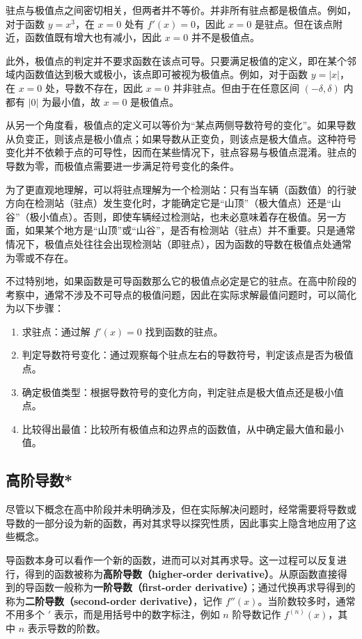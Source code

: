 驻点与极值点之间密切相关，但两者并不等价。并非所有驻点都是极值点。例如，对于函数 $y = x^3$，在 $x = 0$ 处有 $f'(x) = 0$，因此 $x = 0$ 是驻点。但在该点附近，函数值既有增大也有减小，因此 $x = 0$ 并不是极值点。

此外，极值点的判定并不要求函数在该点可导。只要满足极值的定义，即在某个邻域内函数值达到极大或极小，该点即可被视为极值点。例如，对于函数 $y = |x|$，在 $x = 0$ 处，导数不存在，因此 $x = 0$ 并非驻点。但由于在任意区间 $(-\delta, \delta)$ 内都有 $|0|$ 为最小值，故 $x = 0$ 是极值点。

从另一个角度看，极值点的定义可以等价为“某点两侧导数符号的变化”。如果导数从负变正，则该点是极小值点；如果导数从正变负，则该点是极大值点。这种符号变化并不依赖于点的可导性，因而在某些情况下，驻点容易与极值点混淆。驻点的导数为零，而极值点需要进一步满足符号变化的条件。

为了更直观地理解，可以将驻点理解为一个检测站：只有当车辆（函数值）的行驶方向在检测站（驻点）发生变化时，才能确定它是“山顶”（极大值点）还是“山谷”（极小值点）。否则，即使车辆经过检测站，也未必意味着存在极值。另一方面，如果某个地方是“山顶”或“山谷”，是否有检测站（驻点）并不重要。只是通常情况下，极值点处往往会出现检测站（即驻点），因为函数的导数在极值点处通常为零或不存在。

不过特别地，如果函数是可导函数那么它的极值点必定是它的驻点。在高中阶段的考察中，通常不涉及不可导点的极值问题，因此在实际求解最值问题时，可以简化为以下步骤：

\begin{enumerate}
\item 求驻点：通过解 $f'(x) = 0$ 找到函数的驻点。
\item 判定导数符号变化：通过观察每个驻点左右的导数符号，判定该点是否为极值点。
\item 确定极值类型：根据导数符号的变化方向，判定驻点是极大值点还是极小值点。
\item 比较得出最值：比较所有极值点和边界点的函数值，从中确定最大值和最小值。
\end{enumerate}

\subsection{高阶导数*}

尽管以下概念在高中阶段并未明确涉及，但在实际解决问题时，经常需要将导数或导数的一部分设为新的函数，再对其求导以探究性质，因此事实上隐含地应用了这些概念。

导函数本身可以看作一个新的函数，进而可以对其再求导。这一过程可以反复进行，得到的函数被称为\textbf{高阶导数（higher-order derivative）}。从原函数直接得到的导函数一般称为\textbf{一阶导数（first-order derivative）}；通过代换再求导得到的称为\textbf{二阶导数（second-order derivative）}，记作 $f''(x)$。当阶数较多时，通常不用多个 $'$ 表示，而是用括号中的数字标注，例如 $n$ 阶导数记作 $f^{(n)}(x)$，其中 $n$ 表示导数的阶数。

